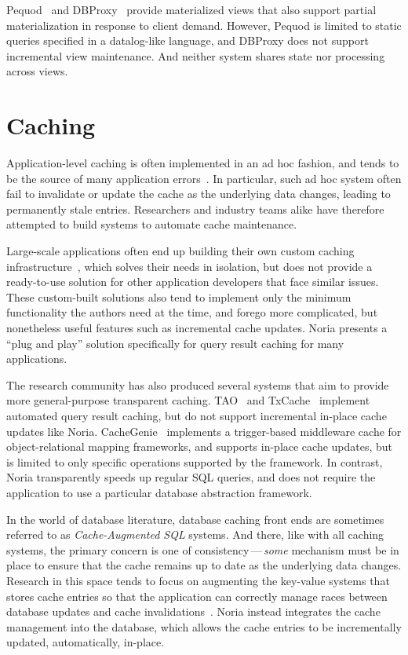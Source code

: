 Pequod~\cite{pequod} and DBProxy~\cite{dbproxy} provide materialized views that
also support partial materialization in response to client demand. However,
Pequod is limited to static queries specified in a datalog-like language, and
DBProxy does not support incremental view maintenance. And neither system shares
state nor processing across views.

\section{Caching}

Application-level caching is often implemented in an ad hoc fashion, and tends
to be the source of many application errors~\cite{ad-hoc-caching}. In
particular, such ad hoc system often fail to invalidate or update the cache as
the underlying data changes, leading to permanently stale entries. Researchers
and industry teams alike have therefore attempted to build systems to automate
cache maintenance.

Large-scale applications often end up building their own custom caching
infrastructure~\cite{facebook-memcache, flannel}, which solves their needs in
isolation, but does not provide a ready-to-use solution for other application
developers that face similar issues. These custom-built solutions also tend to
implement only the minimum functionality the authors need at the time, and
forego more complicated, but nonetheless useful features such as incremental
cache updates. Noria presents a ``plug and play'' solution specifically for
query result caching for many applications.

The research community has also produced several systems that aim to provide
more general-purpose transparent caching. TAO~\cite{tao} and
TxCache~\cite{txcache} implement automated query result caching, but do not
support incremental in-place cache updates like Noria.
CacheGenie~\cite{cachegenie} implements a trigger-based middleware cache for
object-relational mapping frameworks, and supports in-place cache updates, but
is limited to only specific operations supported by the framework. In contrast,
Noria transparently speeds up regular SQL queries, and does not require the
application to use a particular database abstraction framework.

In the world of database literature, database caching front ends are sometimes
referred to as \textit{Cache-Augmented SQL} systems. And there, like with all
caching systems, the primary concern is one of consistency\,---\,\emph{some}
mechanism must be in place to ensure that the cache remains up to date as the
underlying data changes. Research in this space tends to focus on augmenting the
key-value systems that stores cache entries so that the application can
correctly manage races between database updates and cache
invalidations~\cite{facebook-memcache, casql-consistency,
casql-consistency-thesis}. Noria instead integrates the cache management into
the database, which allows the cache entries to be incrementally updated,
automatically, in-place.

